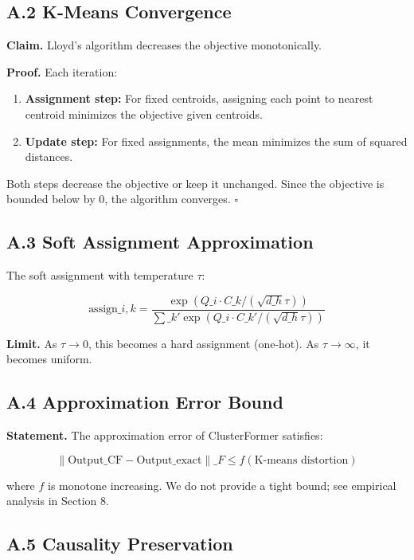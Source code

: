 \subsection{A.2 K-Means Convergence}

\textbf{Claim.} Lloyd's algorithm decreases the objective monotonically.

\textbf{Proof.} Each iteration:

\begin{enumerate}
\item \textbf{Assignment step:} For fixed centroids, assigning each point to
  nearest centroid minimizes the objective given centroids.
\item \textbf{Update step:} For fixed assignments, the mean minimizes the sum of
  squared distances.

\end{enumerate}
Both steps decrease the objective or keep it unchanged. Since the objective 
is bounded below by 0, the algorithm converges. $\square$

\subsection{A.3 Soft Assignment Approximation}

The soft assignment with temperature $\tau$:

\[
\text{assign}\_{i,k} = \frac{\exp(Q\_i \cdot C\_k / (\sqrt{d\_h} \tau))}{\sum\_{k'} \exp(Q\_i \cdot C\_{k'} / (\sqrt{d\_h} \tau))}
\]

\textbf{Limit.} As $\tau \to 0$, this becomes a hard assignment (one-hot). As 
$\tau \to \infty$, it becomes uniform.

\subsection{A.4 Approximation Error Bound}

\textbf{Statement.} The approximation error of ClusterFormer satisfies:

\[
\|\text{Output}\_\text{CF} - \text{Output}\_\text{exact}\|\_F \leq f(\text{K-means distortion})
\]

where $f$ is monotone increasing. We do not provide a tight bound; see 
empirical analysis in Section 8.

\subsection{A.5 Causality Preservation}

